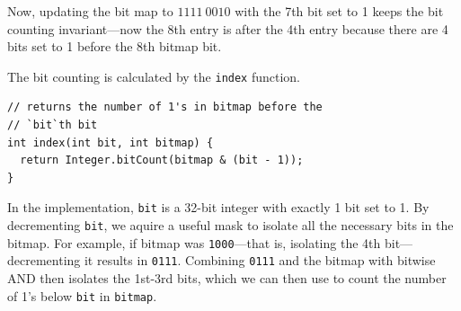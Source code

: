 \documentclass[preprint]{sigplanconf}
\begin{document}

Now, updating the bit map to $1111\ 0010$
with the 7th bit set to 1 keeps the bit counting
invariant---now the 8th entry is after the 4th
entry because there are 4 bits set to 1
before the 8th bitmap bit.

The bit counting is calculated by
the \texttt{index} function.

\begin{verbatim}
// returns the number of 1's in bitmap before the 
// `bit`th bit
int index(int bit, int bitmap) {
  return Integer.bitCount(bitmap & (bit - 1));
}
\end{verbatim}

In the implementation, \texttt{bit}
is a 32-bit integer with exactly 1 bit set to 1.
By decrementing \texttt{bit}, we aquire
a useful mask to isolate all the necessary
bits in the bitmap.
For example, if bitmap was \texttt{1000}---that
is, isolating the 4th bit---decrementing it results 
in \texttt{0111}.
Combining \texttt{0111}
and the bitmap with bitwise AND then isolates the 1st-3rd bits, which
we can then use to count the number of 1's
below \texttt{bit} in \texttt{bitmap}.
\end{document}
